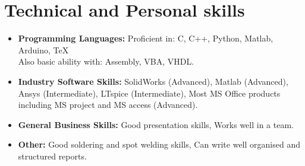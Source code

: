 \section{Technical and Personal skills}

\vspace{6pt}

\begin{itemize}
    
    \item \textbf{Programming Languages:} Proficient in: C, C++, Python, Matlab, Arduino, TeX \\ Also basic ability with: Assembly, VBA, VHDL.
          
          \vspace{6pt}
          
    \item \textbf{Industry Software Skills:} SolidWorks (Advanced), Matlab (Advanced), Ansys (Intermediate),  LTspice (Intermediate), Most MS Office products including MS project and MS access (Advanced).
          
          \vspace{6pt}
          
    \item \textbf{General Business Skills:} Good presentation skills, Works well in a team.
          
          \vspace{6pt}
          
    \item \textbf{Other:} Good soldering and spot welding skills, Can write well organised and structured reports.
          
\end{itemize}